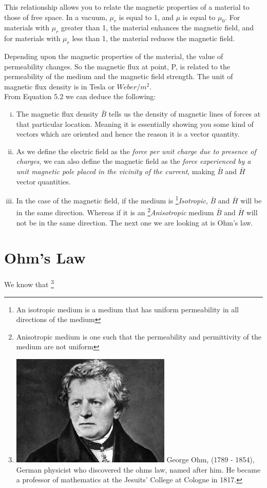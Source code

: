 This relationship allows you to relate the magnetic properties of a material to those of free space. In a vacuum, \( \mu_r \) is equal to 1, and \( \mu \) is equal to \( \mu_0 \). For materials with \( \mu_r \) greater than 1, the material enhances the magnetic field, and for materials with \( \mu_r \) less than 1, the material reduces the magnetic field.

Depending upon the magnetic properties of the material, the value of permeability changes. So the magnetic flux at point, P, is related to the permeability of the medium and the magnetic field strength. The unit of magnetic flux density is in Tesla or $Weber/m^{2}$.\\
From Equation 5.2 we can deduce the following:
\begin{enumerate}[(i)]
	\item The magnetic flux density $\bar{B}$ tells us the density of magnetic lines of forces at that particular location. Meaning it is essentially showing you some kind of vectors which are oriented and hence the reason it is a vector quantity.
	\item As we define the electric field as the \emph{force per unit charge due to presence of charges}, we can also define the magnetic field as the \emph{force experienced by a unit magnetic pole placed in the vicinity of the current}, making $\bar{B}$ and $\bar{H}$ vector quantities.
	\item In the case of the magnetic field, if the medium is \footnote[2]{An isotropic medium is a medium that has uniform permeability in all directions of the medium }\emph{Isotropic}, $\bar{B}$ and $\bar{H}$ will be in the same direction. Whereas if it is an \footnote[3]{Anisotropic medium is one such that the permeability and permittivity of the medium are not uniform }\emph{Anisotropic} medium $\bar{B}$ and $\bar{H}$ will not be in the same direction. The next one we are looking at is Ohm's law.
\end{enumerate}

\section{Ohm's Law} 
We know that 
\footnote[4]{
\includegraphics[scale=0.2]{graphics/ohms} 
George Ohm, (1789 - 1854), German physicist who discovered the ohms law, named after him. He became a professor of mathematics at the Jesuits’ College at Cologne in 1817.
}


